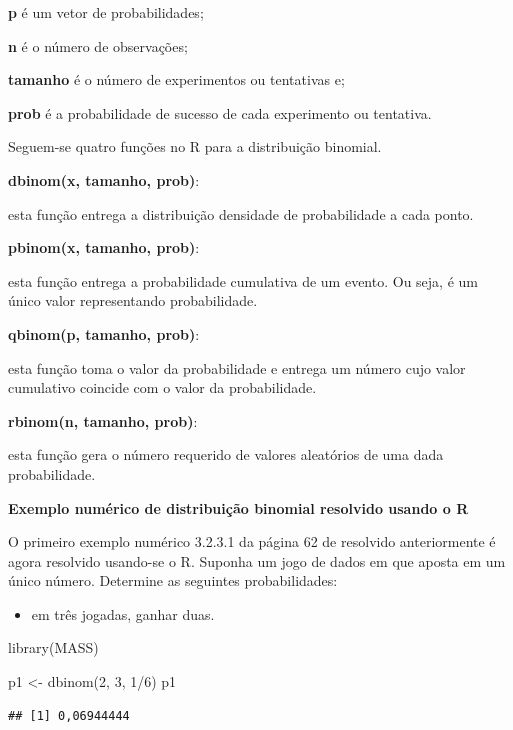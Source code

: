 \documentclass[
]{book}
\newenvironment{Shaded}{\begin{snugshade}}{\end{snugshade}}
\newcommand{\DecValTok}[1]{\textcolor[rgb]{0.00,0.00,0.81}{#1}}
\newcommand{\FunctionTok}[1]{\textcolor[rgb]{0.00,0.00,0.00}{#1}}
\newcommand{\NormalTok}[1]{#1}
\newcommand{\OtherTok}[1]{\textcolor[rgb]{0.56,0.35,0.01}{#1}}
\newcommand{\SpecialCharTok}[1]{\textcolor[rgb]{0.00,0.00,0.00}{#1}}
\providecommand{\tightlist}{%
  \setlength{\itemsep}{0pt}\setlength{\parskip}{0pt}}
\begin{document}
\textbf{p} é um vetor de probabilidades;

\textbf{n} é o número de observações;

\textbf{tamanho} é o número de experimentos ou tentativas e;

\textbf{prob} é a probabilidade de sucesso de cada experimento ou tentativa.

Seguem-se quatro funções no R para a distribuição binomial.

\textbf{dbinom(x, tamanho, prob)}:

esta função entrega a distribuição densidade de probabilidade a cada ponto.

\textbf{pbinom(x, tamanho, prob)}:

esta função entrega a probabilidade cumulativa de um evento. Ou seja, é um único valor representando probabilidade.

\textbf{qbinom(p, tamanho, prob)}:

esta função toma o valor da probabilidade e entrega um número cujo valor cumulativo coincide com o valor da probabilidade.

\textbf{rbinom(n, tamanho, prob)}:

esta função gera o número requerido de valores aleatórios de uma dada probabilidade.

\textbf{Exemplo numérico de distribuição binomial resolvido usando o R}

O primeiro exemplo numérico 3.2.3.1 da página 62 de \citet{Sartoris2013} resolvido anteriormente é agora resolvido usando-se o R. Suponha um jogo de dados em que aposta em um único número. Determine as seguintes probabilidades:

\begin{itemize}
\tightlist
\item
  em três jogadas, ganhar duas.
\end{itemize}

\begin{Shaded}
\begin{Highlighting}[]
\FunctionTok{library}\NormalTok{(MASS)}

\NormalTok{p1 }\OtherTok{\textless{}{-}} \FunctionTok{dbinom}\NormalTok{(}\DecValTok{2}\NormalTok{, }\DecValTok{3}\NormalTok{, }\DecValTok{1}\SpecialCharTok{/}\DecValTok{6}\NormalTok{)}
\NormalTok{p1}
\end{Highlighting}
\end{Shaded}

\begin{verbatim}
## [1] 0,06944444
\end{verbatim}
\end{document}
